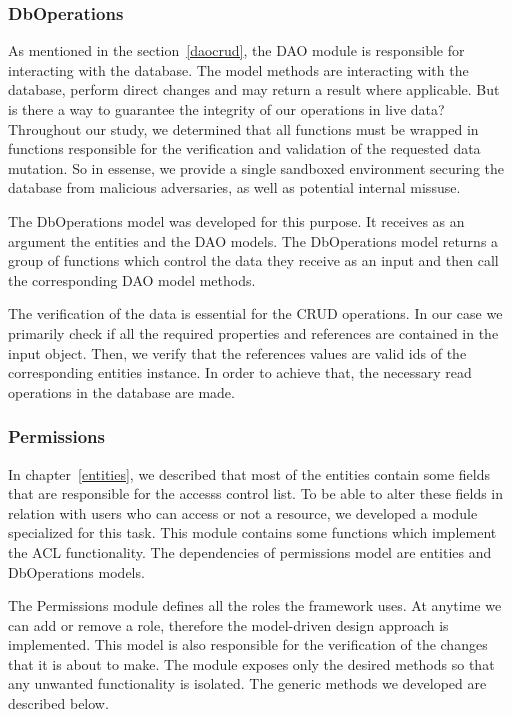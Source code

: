 \subsubsection{DbOperations}
As mentioned in the section~\ref{daocrud}, the DAO module is responsible for interacting with the database. The model methods are interacting with the database, perform direct changes and may return a result where applicable. But is there a way to guarantee the integrity of our operations in live data? Throughout our study, we determined that all functions must be wrapped in functions responsible for the verification and validation of the requested data mutation. So in essense, we provide a single sandboxed environment securing the database from malicious adversaries, as well as potential internal missuse. \par 
	The DbOperations model was developed for this purpose. It receives as an argument the entities and the DAO models. The DbOperations model returns a group of functions which control the data they receive as an input and then call the corresponding DAO model methods. \par 
	The verification of the data is essential for the CRUD operations. In our case we primarily check if all the required properties and references are contained in the input object. Then, we verify that the references values are valid ids of the corresponding entities instance. In order to achieve that, the necessary read operations in the database are made.
	
\subsubsection{Permissions}
In chapter~\ref{entities}, we described that most of the entities contain some fields that are responsible for the accesss control list. To be able to alter these fields in relation with users who can access or not a resource, we developed a module specialized for this task. This module contains some functions which implement the ACL functionality. The dependencies of permissions model are entities and DbOperations models. \par 
	The Permissions module defines all the roles the framework uses. At anytime we can add or remove a role, therefore the model-driven design approach is implemented. This model is also responsible for the verification of the changes that it is about to make. The module exposes only the desired methods so that any unwanted functionality is isolated. The generic methods we developed are described below. 

